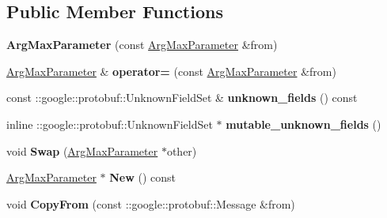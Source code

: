 \subsection*{Public Member Functions}
\begin{DoxyCompactItemize}
\item 
\mbox{\label{classcaffe_1_1_arg_max_parameter_a620713fe524646479cbd372adbd0d722}} 
{\bfseries Arg\+Max\+Parameter} (const \mbox{\hyperlink{classcaffe_1_1_arg_max_parameter}{Arg\+Max\+Parameter}} \&from)
\item 
\mbox{\label{classcaffe_1_1_arg_max_parameter_a2a0fb48f8c5aa636a5cc50f6384a8a43}} 
\mbox{\hyperlink{classcaffe_1_1_arg_max_parameter}{Arg\+Max\+Parameter}} \& {\bfseries operator=} (const \mbox{\hyperlink{classcaffe_1_1_arg_max_parameter}{Arg\+Max\+Parameter}} \&from)
\item 
\mbox{\label{classcaffe_1_1_arg_max_parameter_a7af6fe08f23a649b1082b461f228d67d}} 
const \+::google\+::protobuf\+::\+Unknown\+Field\+Set \& {\bfseries unknown\+\_\+fields} () const
\item 
\mbox{\label{classcaffe_1_1_arg_max_parameter_a413f4e3129edd8532a4c320e9d063a7f}} 
inline \+::google\+::protobuf\+::\+Unknown\+Field\+Set $\ast$ {\bfseries mutable\+\_\+unknown\+\_\+fields} ()
\item 
\mbox{\label{classcaffe_1_1_arg_max_parameter_ad77ce47f3768c6cf1608b6a421fe12bb}} 
void {\bfseries Swap} (\mbox{\hyperlink{classcaffe_1_1_arg_max_parameter}{Arg\+Max\+Parameter}} $\ast$other)
\item 
\mbox{\label{classcaffe_1_1_arg_max_parameter_a01e39c5cc670cc510fe6f55250b81787}} 
\mbox{\hyperlink{classcaffe_1_1_arg_max_parameter}{Arg\+Max\+Parameter}} $\ast$ {\bfseries New} () const
\item 
\mbox{\label{classcaffe_1_1_arg_max_parameter_a2f2f68bbf30d060da2aea09f2fc41545}} 
void {\bfseries Copy\+From} (const \+::google\+::protobuf\+::\+Message \&from)
\item 
\mbox{\label{classcaffe_1_1_arg_max_parameter_a5fc9078e77ee5ad381eaa925efe6371e}} 

\end{DoxyCompactItemize}
